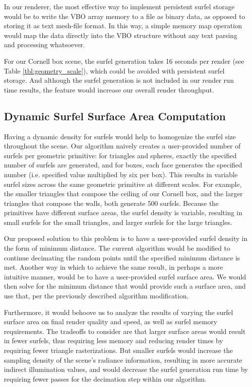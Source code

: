 In our renderer, the most effective way to implement persistent surfel storage would be to write the VBO array memory to a file as binary data, as opposed to storing it as text mesh-file format. In this way, a simple memory map operation would map the data directly into the VBO structure without any text parsing and processing whatsoever.

For our Cornell box scene, the surfel generation takes 16 seconds per render (see Table \ref{tbl:geometry_scale}), which could be avoided with persistent surfel storage. And although the surfel generation is not included in our render run time results, the feature would increase our overall render throughput.

\subsection{Dynamic Surfel Surface Area Computation}
Having a dynamic density for surfels would help to homogenize the surfel size throughout the scene. Our algorithm naively creates a user-provided number of surfels per geometric primitive: for triangles and spheres, exactly the specified number of surfels are generated, and for boxes, each face generates the specified number (i.e. specified value multiplied by six per box). This results in variable surfel sizes across the same geometric primitive at different scales. For example, the smaller triangles that compose the ceiling of our Cornell box, and the larger triangles that compose the walls, both generate 500 surfels. Because the primitives have different surface areas, the surfel density is variable, resulting in small surfels for the small triangles, and larger surfels for the large triangles.

Our proposed solution to this problem is to have a user-provided surfel density in the form of minimum distance. The current algorithm would be modified to continue decimating the random points until the specified minimum distance is met. Another way in which to achieve the same result, in perhaps a more intuitive manner, would be to have a user-provided surfel surface area. We would then solve for the minimum distance that would provide such a surface area, and use that, per the previously described algorithm modification.

Furthermore, it would behoove us to analyze the results of varying the surfel surface area on final render quality and speed, as well as surfel memory requirements. The tradeoffs to consider are that larger surface areas would result in fewer surfels, thus requiring less memory and reducing render times by requiring fewer triangle rasterizations. But smaller surfels would increase the sampling density of the scene's radiance information, resulting in more accurate indirect illumination values, and would decrease the surfel generation run time by requiring fewer passes for the decimation step within our algorithm.

